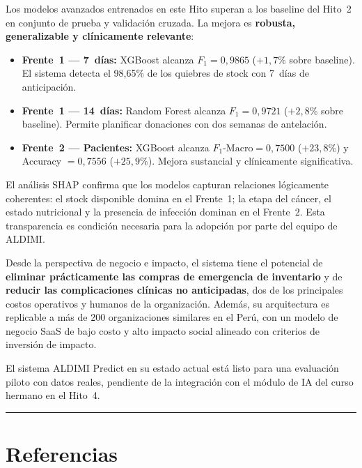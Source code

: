 \documentclass[12pt, a4paper]{article}
\begin{document}
Los modelos avanzados entrenados en este Hito superan a los baseline del Hito~2 en conjunto de prueba y validaci\'on cruzada. La mejora es \textbf{robusta, generalizable y cl\'inicamente relevante}:

\begin{itemize}[leftmargin=1.5em, itemsep=5pt]
  \item \textbf{Frente~1 --- 7~d\'ias:} XGBoost alcanza $F_1 = 0{,}9865$ ($+1{,}7\%$ sobre baseline). El sistema detecta el 98{,}65\% de los quiebres de stock con 7~d\'ias de anticipaci\'on.
  \item \textbf{Frente~1 --- 14~d\'ias:} Random Forest alcanza $F_1 = 0{,}9721$ ($+2{,}8\%$ sobre baseline). Permite planificar donaciones con dos semanas de antelaci\'on.
  \item \textbf{Frente~2 --- Pacientes:} XGBoost alcanza $F_1\text{-Macro} = 0{,}7500$ ($+23{,}8\%$) y Accuracy $= 0{,}7556$ ($+25{,}9\%$). Mejora sustancial y cl\'inicamente significativa.
\end{itemize}

El an\'alisis SHAP confirma que los modelos capturan relaciones l\'ogicamente coherentes: el stock disponible domina en el Frente~1; la etapa del c\'ancer, el estado nutricional y la presencia de infecci\'on dominan en el Frente~2. Esta transparencia es condici\'on necesaria para la adopci\'on por parte del equipo de ALDIMI.

Desde la perspectiva de negocio e impacto, el sistema tiene el potencial de \textbf{eliminar pr\'acticamente las compras de emergencia de inventario} y de \textbf{reducir las complicaciones cl\'inicas no anticipadas}, dos de los principales costos operativos y humanos de la organizaci\'on. Adem\'as, su arquitectura es replica\-ble a m\'as de 200 organizaciones similares en el Per\'u, con un modelo de negocio SaaS de bajo costo y alto impacto social alineado con criterios de inversi\'on de impacto.

El sistema ALDIMI Predict en su estado actual est\'a listo para una evaluaci\'on piloto con datos reales, pendiente de la integraci\'on con el m\'odulo de IA del curso hermano en el Hito~4.

\vspace{1cm}
\textcolor{secundario}{\rule{\linewidth}{0.8pt}}

\section*{Referencias}
\end{document}
